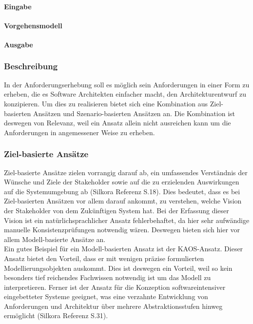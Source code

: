 \paragraph{Eingabe}

\paragraph{Vorgehensmodell}
\paragraph{Ausgabe}

\subsubsection{Beschreibung}
In der Anforderungserhebung soll es m\"oglich sein Anforderungen in einer Form zu erheben, die es Software Architekten einfacher macht, den Architekturentwurf zu konzipieren. Um dies zu realisieren bietet sich eine Kombination aus Ziel-basierten Ans\"atzen und Szenario-basierten Ans\"atzen an. Die Kombination ist deswegen von Relevanz, weil ein Ansatz allein nicht ausreichen kann um die Anforderungen in angemessener Weise zu erheben.\\

\subsubsection{Ziel-basierte Ans\"atze}
Ziel-basierte Ans\"atze zielen vorrangig darauf ab, ein umfassendes Verst\"andnis der W\"unsche und Ziele der Stakeholder sowie auf die zu erzielenden Auswirkungen auf die Systemumgebung ab (Silkora Referenz S.18). Dies bedeutet, dass es bei Ziel-basierten Ans\"atzen vor allem darauf ankommt, zu verstehen, welche Vision der Stakeholder von dem Zuk\"unftigen System hat. Bei der Erfassung dieser Vision ist ein nat\"urlichsprachlicher Ansatz fehlerbehaftet, da hier sehr aufw\"andige manuelle Konsistenzpr\"ufungen notwendig w\"aren. Deswegen bieten sich hier vor allem Modell-basierte Ans\"atze an.\\

Ein gutes Beispiel f\"ur ein Modell-basierten Ansatz ist der KAOS-Ansatz. Dieser Ansatz bietet den Vorteil, dass er mit wenigen pr\"azise formulierten Modellierungsobjekten auskommt. Dies ist deswegen ein Vorteil, weil so kein besonders tief reichendes Fachwissen notwendig ist um das Modell zu interpretieren. Ferner ist der Ansatz f\"ur die Konzeption softwareintensiver eingebetteter Systeme geeignet, was eine verzahnte Entwicklung von Anforderungen und Architektur \"uber mehrere Abstraktionsstufen hinweg erm\"oglicht (Silkora Referenz S.31).\\

